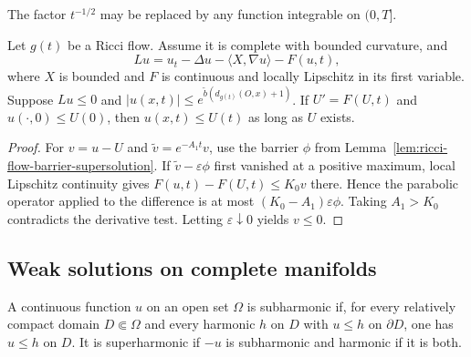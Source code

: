 \begin{remark}
\label{rem:wmp-integrable-time-singularity}
The factor $t^{-1/2}$ may be replaced by any function integrable on $(0,T]$.
\end{remark}

\begin{theorem}
\label{thm:noncompact-scalar-pde-ode-comparison}
Let $g(t)$ be a Ricci flow.  Assume it is complete with bounded curvature, and
\[
Lu=u_t-\Delta u-\langle X,\nabla u\rangle-F(u,t),
\]
where $X$ is bounded and $F$ is continuous and locally Lipschitz in its first
variable.  Suppose $Lu\leq0$ and
$|u(x,t)|\leq e^{\widetilde b(d_{g(t)}(O,x)+1)}$.  If $U'=F(U,t)$ and
$u(\cdot,0)\leq U(0)$, then $u(x,t)\leq U(t)$ as long as $U$ exists.
\end{theorem}

\begin{proof}
For $v=u-U$ and $\widetilde v=e^{-A_1t}v$, use the barrier $\phi$ from
Lemma~\ref{lem:ricci-flow-barrier-supersolution}.  If
$\widetilde v-\varepsilon\phi$ first vanished at a positive maximum, local
Lipschitz continuity gives $F(u,t)-F(U,t)\leq K_0v$ there.  Hence the
parabolic operator applied to the difference is at most
$(K_0-A_1)\varepsilon\phi$.  Taking $A_1>K_0$ contradicts the derivative
test.  Letting $\varepsilon\downarrow0$ yields $v\leq0$.
\end{proof}

\subsection{Weak solutions on complete manifolds}

\begin{definition}
\label{def:continuous-subharmonic-function}
A continuous function $u$ on an open set $\Omega$ is subharmonic if, for every
relatively compact domain $D\Subset\Omega$ and every harmonic $h$ on $D$ with
$u\leq h$ on $\partial D$, one has $u\leq h$ on $D$.  It is superharmonic if
$-u$ is subharmonic and harmonic if it is both.
\end{definition}

